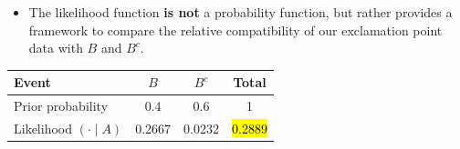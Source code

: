 \documentclass[12pt]{beamer}
\begin{document}
\begin{frame}{}
\begin{block}{}
\begin{itemize}
\item The likelihood function \textbf{is not} a probability function, but rather provides a framework to compare the relative compatibility of our exclamation point data with $B$ and $B^c$.
\end{itemize}
\begin{table}[h]
\centering
\begin{tabular}{lccc}
\hline
\textbf{Event}              & \(B\)  & \(B^c\) & \textbf{Total} \\
\hline
Prior probability           & 0.4    & 0.6     & 1              \\[0.1cm]
Likelihood $(\cdot \mid A)$ & 0.2667 & 0.0232  & \hl{0.2889}    \\
\hline
\end{tabular}
\end{table}
\end{block}
\end{frame}
\end{document}
